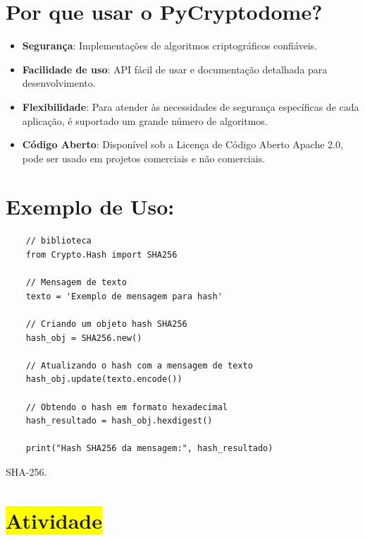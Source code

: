 \documentclass[a4paper,12pt]{article}
\begin{document}
\section{Por que usar o PyCryptodome?}

\begin{itemize}
\item \textbf{Segurança}: Implementações de algoritmos criptográficos confiáveis.

\item \textbf{Facilidade de uso}: API fácil de usar e documentação detalhada para desenvolvimento.

\item \textbf{Flexibilidade}: Para atender às necessidades de segurança específicas de cada aplicação, 
é suportado um grande número de algoritmos.

\item \textbf{Código Aberto}: Disponível sob a Licença de Código Aberto Apache 2.0, pode ser 
usado em projetos comerciais e não comerciais.

\end{itemize}

\section{Exemplo de Uso:}

\begin{listing}[!ht]
    \begin{verbatim}
    // biblioteca
    from Crypto.Hash import SHA256

    // Mensagem de texto
    texto = 'Exemplo de mensagem para hash'

    // Criando um objeto hash SHA256
    hash_obj = SHA256.new()

    // Atualizando o hash com a mensagem de texto
    hash_obj.update(texto.encode())

    // Obtendo o hash em formato hexadecimal
    hash_resultado = hash_obj.hexdigest()

    print("Hash SHA256 da mensagem:", hash_resultado)

    \end{verbatim}
    \caption{SHA-256.}
\end{listing}

\section{\colorbox{yellow}{Atividade}}
\end{document}

